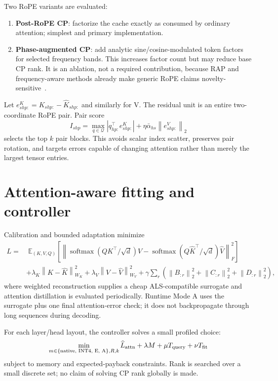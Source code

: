 \documentclass[11pt]{article}
\newcommand{\E}{\mathbb{E}}
\newcommand{\norm}[1]{\left\lVert #1\right\rVert}
\newcommand{\softmax}{\operatorname{softmax}}
\newcommand{\term}[1]{\textbf{\color{accent!85!black}#1}}
\begin{document}
Two RoPE variants are evaluated:
\begin{enumerate}[leftmargin=1.55em,itemsep=2pt]
\item \term{Post-RoPE CP}: factorize the cache exactly as consumed by ordinary attention; simplest
and primary implementation.
\item \term{Phase-augmented CP}: add analytic sine/cosine-modulated token factors for selected
frequency bands. This increases factor count but may reduce base CP rank. It is an ablation, not a
required contribution, because RAP and frequency-aware methods already make generic RoPE claims
novelty-sensitive~\cite{rap}.
\end{enumerate}

Let $e^K_{shp:}=K_{shp:}-\widehat K_{shp:}$ and similarly for V. The residual unit is an entire
two-coordinate RoPE pair. Pair score
\[
I_{shp}=\max_{q\in\mathcal Q}|q_{hp:}^{\top}e^K_{shp:}|
+\eta\bar\alpha_{hs}\norm{e^V_{shp:}}_2
\]
selects the top $k$ pair blocks. This avoids scalar index scatter, preserves pair rotation, and
targets errors capable of changing attention rather than merely the largest tensor entries.

\section{Attention-aware fitting and controller}

Calibration and bounded adaptation minimize
\begin{align}
L=&\;\E_{(K,V,Q)}\left[
\norm{\softmax(QK^\top/\sqrt d)V-
\softmax(Q\widehat K^\top/\sqrt d)\widehat V}_F^2\right] \\
&+\lambda_K\norm{K-\widehat K}_{W_K}^2
+\lambda_V\norm{V-\widehat V}_{W_V}^2
+\gamma\sum_r\left(\norm{B_{:r}}_2^2+\norm{C_{:r}}_2^2+\norm{D_{:r}}_2^2\right),
\end{align}
where weighted reconstruction supplies a cheap ALS-compatible surrogate and attention distillation
is evaluated periodically. Runtime Mode A uses the surrogate plus one final attention-error check;
it does not backpropagate through long sequences during decoding.

For each layer/head layout, the controller solves a small profiled choice:
\[
\min_{m\in\{\text{native, INT4, E, A}\},R,k}
\widehat L_{\rm attn}+\lambda M+\mu T_{\rm query}+\nu T_{\rm fit}
\]
subject to memory and expected-payback constraints. Rank is searched over a small discrete set; no
claim of solving CP rank globally is made.
\end{document}
